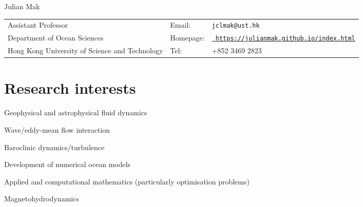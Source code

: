 \documentclass[letterpaper]{article}
\def\name{Julian Mak}
\renewenvironment{itemize}{
  \begin{list}{}{
    \setlength{\leftmargin}{1.5em}
  }
}{
  \end{list}
}
\begin{document}
{\huge \name}


\vspace{0.25in}
\begin{tabular}{lll}
  Assistant Professor & Email: & {\tt jclmak@ust.hk} \\
  Department of Ocean Sciences & Homepage: & \href{https://julianmak.github.io/index.html}{\tt
https://julianmak.github.io/index.html} \\
  Hong Kong University of Science and Technology & Tel: & +852 3469 2823
\end{tabular}
\section*{Research interests}
\begin{itemize}
\item Geophysical and astrophysical fluid dynamics
\begin{itemize}
	\item[--] Wave/eddy-mean flow interaction
	\item[--] Baroclinic dynamics/turbulence
	\item[--] Development of numerical ocean models
	\item[--] Applied and computational mathematics (particularly optimisation problems)
	\item[--] Magnetohydrodynamics
\end{itemize}
\end{itemize}
\end{document}
